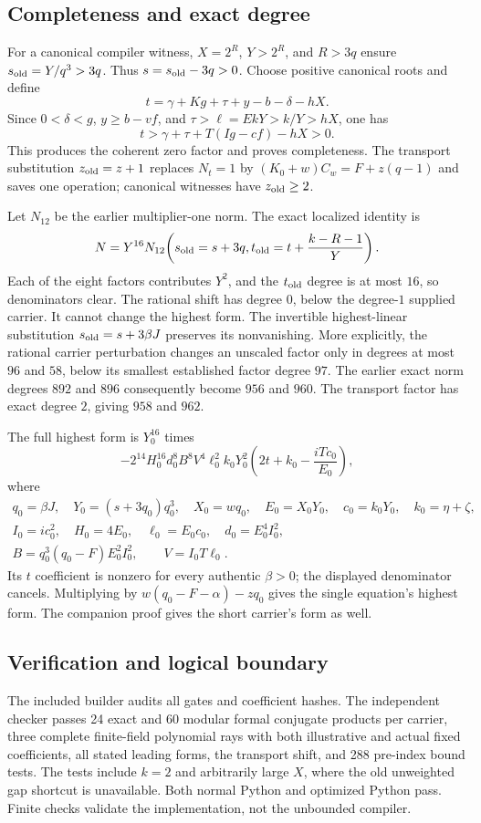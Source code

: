 \subsection{Completeness and exact degree}
For a canonical compiler witness, $X=2^R$, $Y>2^R$, and $R>3q$
ensure $s_{\rm old}=Y/q^3>3q$. Thus $s=s_{\rm old}-3q>0$.
Choose positive canonical roots and define
\[
 t=\gamma+Kg+\tau+y-b-\delta-hX.
\]
Since $0<\delta<g$, $y\ge b-vf$, and
$\tau>\ell=EkY>k/Y>hX$, one has
\[
 t>\gamma+\tau+T(Ig-cf)-hX>0.
\]
This produces the coherent zero factor and proves completeness.
The transport substitution $z_{\rm old}=z+1$ replaces $N_t=1$ by
$(K_0+w)C_w=F+z(q-1)$ and saves one operation; canonical witnesses
have $z_{\rm old}\ge2$.

Let $N_{12}$ be the earlier multiplier-one norm. The exact localized
identity is
\[
 N=Y^{16}N_{12}\!\left(s_{\rm old}=s+3q,
           t_{\rm old}=t+\frac{k-R-1}{Y}\right).
\]
Each of the eight factors contributes $Y^2$, and the $t_{\rm old}$
degree is at most $16$, so denominators clear. The rational shift has
degree $0$, below the degree-$1$ supplied carrier. It cannot change the
highest form. The invertible highest-linear substitution
$s_{\rm old}=s+3\beta J$ preserves its nonvanishing.
More explicitly, the rational carrier perturbation changes an unscaled
factor only in degrees at most $96$ and $58$, below its smallest
established factor degree $97$.
The earlier exact norm degrees $892$ and $896$ consequently become
$956$ and $960$. The transport factor has exact degree $2$, giving
$958$ and $962$.

The full highest form is $Y_0^{16}$ times
\[
 -2^{14}H_0^{16}d_0^8B^8V^4\ell_0^2k_0Y_0^2
       \left(2t+k_0-\frac{iTc_0}{E_0}\right),
\]
where
\begin{gather*}
 q_0=\beta J,\quad Y_0=(s+3q_0)q_0^3,\quad X_0=wq_0,
 \quad E_0=X_0Y_0,\quad c_0=k_0Y_0,\quad k_0=\eta+\zeta,\\
 I_0=ic_0^2,\quad H_0=4E_0,\quad \ell_0=E_0c_0,
 \quad d_0=E_0^4I_0^2,\\
 B=q_0^3(q_0-F)E_0^2I_0^2,\qquad V=I_0T\ell_0.
\end{gather*}
Its $t$ coefficient is nonzero for every authentic $\beta>0$;
the displayed denominator cancels. Multiplying by
$w(q_0-F-\alpha)-zq_0$ gives the single equation's highest form.
The companion proof gives the short carrier's form as well.

\subsection{Verification and logical boundary}
The included builder audits all gates and coefficient hashes. The
independent checker passes 24 exact and 60 modular formal conjugate
products per carrier, three complete finite-field polynomial rays with
both illustrative and actual fixed coefficients, all stated leading
forms, the transport shift, and 288 pre-index bound tests. The tests
include $k=2$ and arbitrarily large $X$, where the old unweighted gap
shortcut is unavailable. Both normal Python and optimized Python pass.
Finite checks validate the implementation, not the unbounded compiler.

